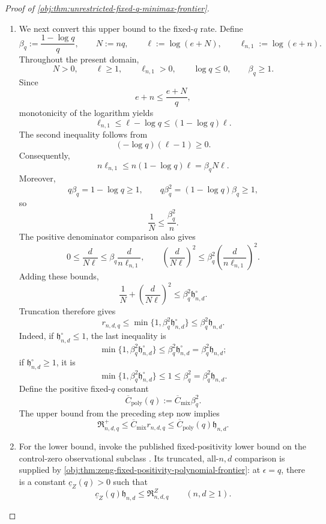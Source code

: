 \begin{proof}[Proof of \cref{obj:thm:unrestricted-fixed-q-minimax-frontier}]
\begin{enumerate}
\item
We next convert this upper bound to the fixed-\(q\) rate. Define
\[
\beta_q:=\frac{1-\log q}{q},
\qquad
N:=nq,
\qquad
\ell:=\log(e+N),
\qquad
\ell_{n,1}:=\log(e+n).
\]
Throughout the present domain,
\[
N>0,\qquad \ell\ge1,\qquad \ell_{n,1}>0,
\qquad \log q\le0,\qquad \beta_q\ge1.
\]
Since
\[
e+n\le\frac{e+N}{q},
\]
monotonicity of the logarithm yields
\[
\ell_{n,1}\le\ell-\log q
\le(1-\log q)\ell.
\]
The second inequality follows from
\[
(-\log q)(\ell-1)\ge0.
\]
Consequently,
\[
n\ell_{n,1}
\le n(1-\log q)\ell
=\beta_q N\ell.
\]
Moreover,
\[
q\beta_q=1-\log q\ge1,
\qquad
q\beta_q^2=(1-\log q)\beta_q\ge1,
\]
so
\[
\frac1N\le\frac{\beta_q^2}{n}.
\]
The positive denominator comparison also gives
\[
0\le\frac{d}{N\ell}
\le\beta_q\frac{d}{n\ell_{n,1}},
\qquad
\left(\frac{d}{N\ell}\right)^2
\le\beta_q^2
\left(\frac{d}{n\ell_{n,1}}\right)^2.
\]
Adding these bounds,
\[
\frac1N+\left(\frac{d}{N\ell}\right)^2
\le\beta_q^2\mathfrak h_{n,d}^{\circ}.
\]
Truncation therefore gives
\[
r_{n,d,q}
\le\min\{1,\beta_q^2\mathfrak h_{n,d}^{\circ}\}
\le\beta_q^2\mathfrak h_{n,d}.
\]
Indeed, if \(\mathfrak h_{n,d}^{\circ}\le1\), the last inequality is
\[
\min\{1,\beta_q^2\mathfrak h_{n,d}^{\circ}\}
\le\beta_q^2\mathfrak h_{n,d}^{\circ}
=\beta_q^2\mathfrak h_{n,d};
\]
if \(\mathfrak h_{n,d}^{\circ}\ge1\), it is
\[
\min\{1,\beta_q^2\mathfrak h_{n,d}^{\circ}\}
\le1\le\beta_q^2
=\beta_q^2\mathfrak h_{n,d}.
\]
Define the positive fixed-\(q\) constant
\[
\overline C_{\mathrm{poly}}(q)
:=\overline C_{\mathrm{mix}}\beta_q^2.
\]
The upper bound from the preceding step now implies
\[
\mathfrak R^+_{n,d,q}
\le\overline C_{\mathrm{mix}}r_{n,d,q}
\le\overline C_{\mathrm{poly}}(q)\mathfrak h_{n,d}.
\]

\item
For the lower bound, invoke the published fixed-positivity lower bound on the control-zero observational subclass
\citep[Theorem~2, Section~3.2, p.~9, with its proof in Section~C.5, pp.~39--44]{ZengBalakrishnanHanKennedy2026}.
Its truncated, all-\(n,d\) comparison is supplied by
\cref{obj:thm:zeng-fixed-positivity-polynomial-frontier}: at \(\epsilon=q\), there is a constant \(\underline c_Z(q)>0\) such that
\[
\underline c_Z(q)\mathfrak h_{n,d}
\le\mathfrak R^Z_{n,d,q}
\qquad(n,d\ge1).
\]


\end{enumerate}
\end{proof}
